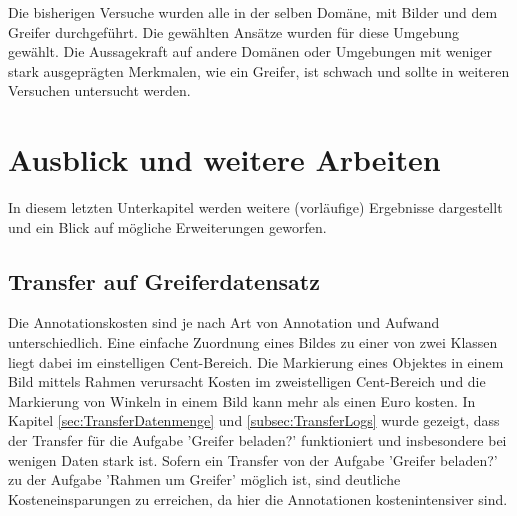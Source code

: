 	Die bisherigen Versuche wurden alle in der selben Domäne, mit  Bilder und dem Greifer durchgeführt. Die gewählten Ansätze wurden für diese Umgebung gewählt. Die Aussagekraft auf andere Domänen oder Umgebungen mit weniger stark ausgeprägten Merkmalen, wie ein Greifer, ist schwach und sollte in weiteren Versuchen untersucht werden.    
							
	\section{Ausblick und weitere Arbeiten}
	\label{sec:AusblickWeitereArbeiten}
	In diesem letzten Unterkapitel werden weitere (vorläufige) Ergebnisse dargestellt und ein Blick auf mögliche Erweiterungen geworfen.

	\subsection{Transfer auf Greiferdatensatz}
	\label{subsec:TransferGreiferDatensatz}
 	Die Annotationskosten sind je nach Art von Annotation und Aufwand unterschiedlich. Eine einfache Zuordnung eines Bildes zu einer von zwei Klassen liegt dabei im einstelligen Cent-Bereich. Die Markierung eines Objektes in einem Bild mittels Rahmen verursacht Kosten im zweistelligen Cent-Bereich und die Markierung von Winkeln in einem Bild kann mehr als einen Euro kosten. In Kapitel \ref{sec:TransferDatenmenge} und \ref{subsec:TransferLogs} wurde gezeigt, dass der Transfer für die Aufgabe 'Greifer beladen?' funktioniert und insbesondere bei wenigen Daten stark ist. Sofern ein Transfer von der Aufgabe 'Greifer beladen?' zu der Aufgabe 'Rahmen um Greifer' möglich ist, sind deutliche Kosteneinsparungen zu erreichen, da hier die Annotationen kostenintensiver sind. 
 	
